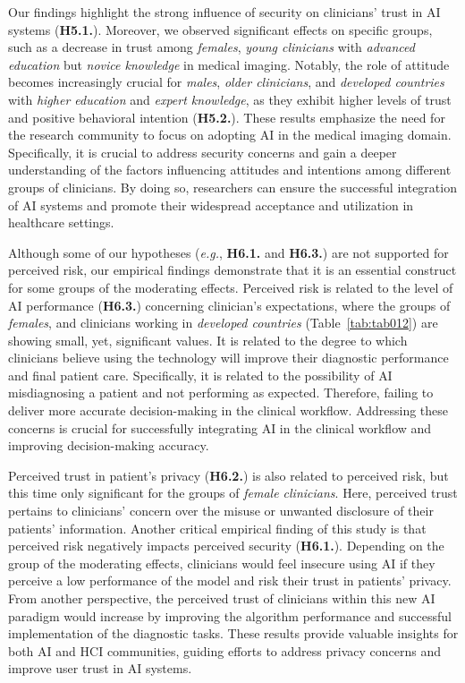 Our findings highlight the strong influence of security on clinicians' trust in \ac{AI} systems ({\bf H5.1.}).
Moreover, we observed significant effects on specific groups, such as a decrease in trust among {\it females}, {\it young clinicians} with {\it advanced education} but {\it novice knowledge} in medical imaging.
Notably, the role of attitude becomes increasingly crucial for {\it males}, {\it older clinicians}, and {\it developed countries} with {\it higher education} and {\it expert knowledge}, as they exhibit higher levels of trust and positive behavioral intention ({\bf H5.2.}).
These results emphasize the need for the research community to focus on adopting \ac{AI} in the medical imaging domain.
Specifically, it is crucial to address security concerns and gain a deeper understanding of the factors influencing attitudes and intentions among different groups of clinicians.
By doing so, researchers can ensure the successful integration of \ac{AI} systems and promote their widespread acceptance and utilization in healthcare settings.

Although some of our hypotheses ({\it e.g.}, {\bf H6.1.} and {\bf H6.3.}) are not supported for perceived risk, our empirical findings demonstrate that it is an essential construct for some groups of the moderating effects.
Perceived risk is related to the level of \ac{AI} performance ({\bf H6.3.}) concerning clinician's expectations, where the groups of {\it females}, and clinicians working in {\it developed countries} (Table~\ref{tab:tab012}) are showing small, yet, significant values.
It is related to the degree to which clinicians believe using the technology will improve their diagnostic performance and final patient care.
Specifically, it is related to the possibility of \ac{AI} misdiagnosing a patient and not performing as expected.
Therefore, failing to deliver more accurate decision-making in the clinical workflow.
Addressing these concerns is crucial for successfully integrating \ac{AI} in the clinical workflow and improving decision-making accuracy.

Perceived trust in patient's privacy ({\bf H6.2.}) is also related to perceived risk, but this time only significant for the groups of {\it female clinicians}.
Here, perceived trust pertains to clinicians' concern over the misuse or unwanted disclosure of their patients' information.
Another critical empirical finding of this study is that perceived risk negatively impacts perceived security ({\bf H6.1.}).
Depending on the group of the moderating effects, clinicians would feel insecure using \ac{AI} if they perceive a low performance of the model and risk their trust in patients' privacy.
From another perspective, the perceived trust of clinicians within this new \ac{AI} paradigm would increase by improving the algorithm performance and successful implementation of the diagnostic tasks.
These results provide valuable insights for both \ac{AI} and \ac{HCI} communities, guiding efforts to address privacy concerns and improve user trust in \ac{AI} systems.


